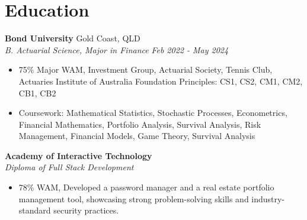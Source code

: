\documentclass[12pt]{article}
\begin{document}
\section*{Education}
\textbf{Bond University} \hfill {Gold Coast, QLD}\\
\textit{\color{subtextgray}B. Actuarial Science, Major in Finance} \hfill \textit{\color{subtextgray}Feb 2022 - May 2024}
\begin{itemize}[noitemsep, topsep=0em, left=-0.8em]
  \item 75\% Major WAM, Investment Group, Actuarial Society, Tennis Club, Actuaries Institute of Australia Foundation Principles: CS1, CS2, CM1, CM2, CB1, CB2
  \item Coursework: Mathematical Statistics, Stochastic Processes, Econometrics, Financial Mathematics, Portfolio Analysis, Survival Analysis, Risk Management, Financial Models, Game Theory, Survival Analysis
\end{itemize}
\textbf{Academy of Interactive Technology} \\
\textit{\color{subtextgray}Diploma of Full Stack Development}
\begin{itemize}[topsep=0em, left=-0.8em]	
\item 78\% WAM, Developed a password manager and a real estate portfolio management tool, showcasing strong problem-solving skills and industry-standard security practices.
\end{itemize}
\end{document}
